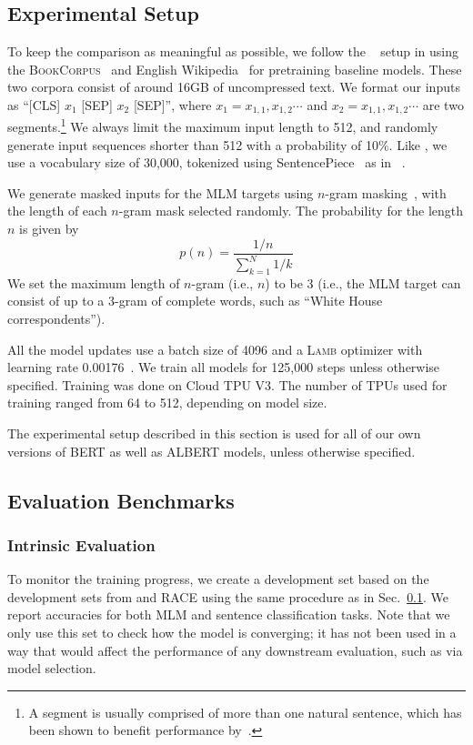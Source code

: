 \subsection{Experimental Setup}
\label{sec:setup}
To keep the comparison as meaningful as possible, we follow the \bert~\citep{devlin2018bert} setup in using the \textsc{BookCorpus}~\citep{zhu2015aligning} and English Wikipedia~\citep{devlin2018bert} for pretraining baseline models.
These two corpora consist of around 16GB of uncompressed text.
We format our inputs as ``\textsc{[CLS]} $x_1$ \textsc{[SEP]} $x_2$ \textsc{[SEP]}'', where $x_1=x_{1,1},x_{1,2}\cdots$ and $x_2=x_{1,1},x_{1,2}\cdots$ are two segments.\footnote{A segment is usually comprised of more than one natural sentence, which has been shown to benefit performance by~\cite{liu2019roberta}.} 
We always limit the maximum input length to 512, and randomly generate input sequences shorter than 512 with a probability of 10\%.
Like \bert, we use a vocabulary size of 30,000, tokenized using SentencePiece~\citep{kudo-richardson-2018-sentencepiece} as in \xlnet~\citep{yang2019xlnet}.

We generate masked inputs for the MLM targets using $n$-gram masking~\citep{joshi2019spanbert}, with the length of each $n$-gram mask selected randomly.
The probability for the length $n$ is given by
$$
    p(n) = \frac{1/n}{\sum_{k=1}^N{1/k}}
$$
We set the maximum length of $n$-gram (i.e., $n$) to be 3 (i.e., the MLM target can consist of up to a 3-gram of complete words, such as ``White House correspondents'').

All the model updates use a batch size of 4096 and a \textsc{Lamb} optimizer with learning rate 0.00176~\citep{you2019reducing}.
We train all models for 125,000 steps unless otherwise specified.
Training was done on Cloud TPU V3.
The number of TPUs used for training ranged from 64 to 512, depending on model size. 

The experimental setup described in this section is used for all of our own versions of BERT as well as ALBERT models, unless otherwise specified. 


\subsection{Evaluation Benchmarks}


\subsubsection{Intrinsic Evaluation}
To monitor the training progress, we create a development set based on the development sets from \squad and RACE using the same procedure as in Sec.~\ref{sec:setup}. 
We report accuracies for both MLM and sentence classification tasks. Note that we only use this set to check how the model is converging; it has not been used in a way that would affect the performance of any downstream evaluation, such as via model selection. 


